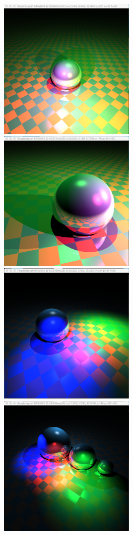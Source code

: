 \includegraphics[width=0.5\textwidth]{img/colPointLights1sphere}
\includegraphics[width=0.5\textwidth]{img/colPointlights1sphere_close}
\includegraphics[width=0.5\textwidth]{img/colSpotlights1sphere}
\includegraphics[width=0.5\textwidth]{img/colSpotlights3spheres}
